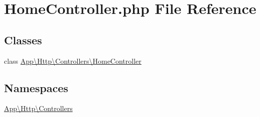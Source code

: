 \hypertarget{_home_controller_8php}{}\section{Home\+Controller.\+php File Reference}
\label{_home_controller_8php}
\subsection*{Classes}
\begin{DoxyCompactItemize}
\item 
class \mbox{\hyperlink{class_app_1_1_http_1_1_controllers_1_1_home_controller}{App\textbackslash{}\+Http\textbackslash{}\+Controllers\textbackslash{}\+Home\+Controller}}
\end{DoxyCompactItemize}
\subsection*{Namespaces}
\begin{DoxyCompactItemize}
\item 
 \mbox{\hyperlink{namespace_app_1_1_http_1_1_controllers}{App\textbackslash{}\+Http\textbackslash{}\+Controllers}}
\end{DoxyCompactItemize}
